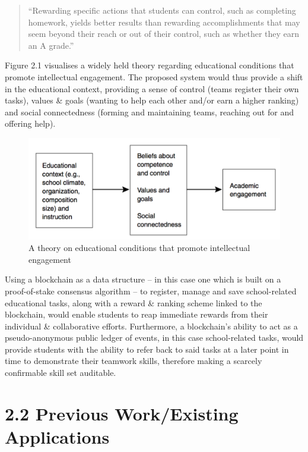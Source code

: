 \documentclass[12pt]{report}
\begin{document}
\begin{quote}
``Rewarding specific actions that students can control, such as
completing homework, yields better results than rewarding
accomplishments that may seem beyond their reach or out of their
control, such as whether they earn an A grade.''\cite{Usher2013}
\end{quote}

Figure 2.1 visualises a widely held theory regarding educational
conditions that promote intellectual engagement\cite{CommitteeonIncreasingHighSchoolStudentsEngagementandMotivationtoLearn2003}. The proposed system would thus provide
a shift in the educational context, providing a sense of control (teams
register their own tasks), values \& goals (wanting to help each other
and/or earn a higher ranking) and social connectedness (forming and
maintaining teams, reaching out for and offering help).

\begin{figure}[htbp]
\centering
\includegraphics{../diagrams/educationalConditions.png}
\caption{A theory on educational conditions that promote intellectual
engagement}
\end{figure}

Using a blockchain as a data structure -- in this case one which is
built on a proof-of-stake consensus algorithm -- to register, manage and
save school-related educational tasks, along with a reward \& ranking
scheme linked to the blockchain, would enable students to reap immediate
rewards from their individual \& collaborative efforts. Furthermore, a
blockchain's ability to act as a pseudo-anonymous public ledger of
events, in this case school-related tasks, would provide students with
the ability to refer back to said tasks at a later point in time to
demonstrate their teamwork skills, therefore making a scarcely
confirmable skill set auditable.

\section{2.2 Previous Work/Existing
Applications}\label{previous-workexisting-applications}
\end{document}
